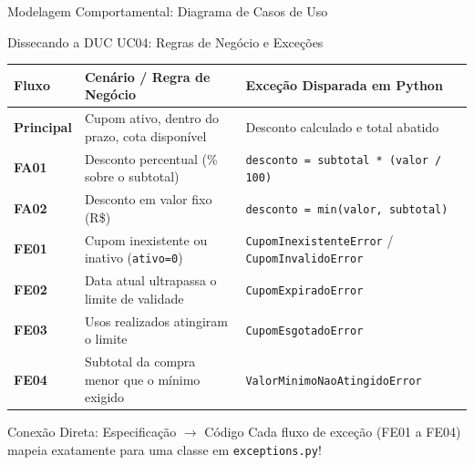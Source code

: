 \documentclass[10pt]{beamer}
\begin{document}
\begin{frame}{Modelagem Comportamental: Diagrama de Casos de Uso}
{
}
\end{frame}

\begin{frame}{Dissecando a DUC UC04: Regras de Negócio e Exceções}
    \begin{table}[h]
    \centering
    \tiny
    \begin{tabular}{lll}
        \toprule
        \textbf{Fluxo} & \textbf{Cenário / Regra de Negócio} & \textbf{Exceção Disparada em Python} \\
        \midrule
        \textbf{Principal} & Cupom ativo, dentro do prazo, cota disponível & Desconto calculado e total abatido \\
        \textbf{FA01} & Desconto percentual (\% sobre o subtotal) & \texttt{desconto = subtotal * (valor / 100)} \\
        \textbf{FA02} & Desconto em valor fixo (R\$) & \texttt{desconto = min(valor, subtotal)} \\
        \midrule
        \textbf{FE01} & Cupom inexistente ou inativo (\texttt{ativo=0}) & \texttt{CupomInexistenteError} / \texttt{CupomInvalidoError} \\
        \textbf{FE02} & Data atual ultrapassa o limite de validade & \texttt{CupomExpiradoError} \\
        \textbf{FE03} & Usos realizados atingiram o limite & \texttt{CupomEsgotadoError} \\
        \textbf{FE04} & Subtotal da compra menor que o mínimo exigido & \texttt{ValorMinimoNaoAtingidoError} \\
        \bottomrule
    \end{tabular}
    \end{table}
    \vspace{0.2cm}
    \begin{alertblock}{Conexão Direta: Especificação $\rightarrow$ Código}
    Cada fluxo de exceção (FE01 a FE04) mapeia exatamente para uma classe em \texttt{exceptions.py}!
    \end{alertblock}
\end{frame}
\end{document}
